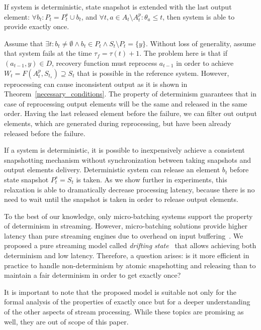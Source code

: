 \begin{theorem}
\label{determinism}
If system is deterministic, state snapshot is extended with the last output element: $\forall{b_t}:P_t=P^{s}_t \cup b_t$, and $\forall{t,a}\in{A_t \setminus A^{p}_t} : \theta_a \leq t$, then system is able to provide exactly once.
\end{theorem}
\begin{sketch}
Assume that $\exists{t}:b_t\neq{\emptyset} \wedge b_t \in P_t \wedge S_{t}\setminus{P_t}=\{y\}$. Without loss of generality, assume that system fails at the time $\tau_f = \tau(t)+1$. The problem here is that if $(a_{t-1},y)\in{D}$, recovery function must reprocess $a_{t-1}$ in order to achieve $W_t=F(A^{p}_t,S_{t_s})\supseteq{S_t}$ that is possible in the reference system. However, reprocessing can cause inconsistent output as it is shown in Theorem~\ref{necessary_conditions}. The property of determinism guarantees that in case of reprocessing output elements will be the same and released in the same order. Having the last released element before the failure, we can filter out output elements, which are generated during reprocessing, but have been already released before the failure.
\end{sketch}

If a system is deterministic, it is possible to inexpensively achieve a consistent snapshotting mechanism without synchronization between taking snapshots and output elements delivery. Deterministic system can release an element $b_t$ before state snapshot $P^{s}_t=S_t$ is taken. As we show further in experiments, this relaxation is able to dramatically decrease processing latency, because there is no need to wait until the snapshot is taken in order to release output elements.

To the best of our knowledge, only micro-batching systems support the property of determinism in streaming. However, micro-batching solutions provide higher latency than pure streaming engines due to overhead on input buffering~\cite{karimov2018benchmarking}. We proposed a pure streaming model called {\em drifting state}~\cite{we2018adbis} that allows achieving both determinism and low latency. Therefore, a question arises: is it more efficient in practice to handle non-determinism by atomic snapshotting and releasing than to maintain a fair determinism in order to get exactly once? 

It is important to note that the proposed model is suitable not only for the formal analysis of the properties of exactly once but for a deeper understanding of the other aspects of stream processing. While these topics are promising as well, they are out of scope of this paper. 

